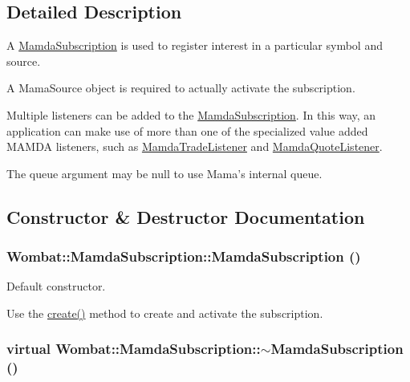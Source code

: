 \subsection{Detailed Description}
A \hyperlink{classWombat_1_1MamdaSubscription}{Mamda\-Subscription} is used to register interest in a particular symbol and source. 

A Mama\-Source object is required to actually activate the subscription.

Multiple listeners can be added to the \hyperlink{classWombat_1_1MamdaSubscription}{Mamda\-Subscription}. In this way, an application can make use of more than one of the specialized value added MAMDA listeners, such as \hyperlink{classWombat_1_1MamdaTradeListener}{Mamda\-Trade\-Listener} and \hyperlink{classWombat_1_1MamdaQuoteListener}{Mamda\-Quote\-Listener}.

The queue argument may be null to use Mama's internal queue. 



\subsection{Constructor \& Destructor Documentation}
\hypertarget{classWombat_1_1MamdaSubscription_ff821c73978e8b6462792aa34daf6fd8}{
\subsubsection[MamdaSubscription]{\setlength{\rightskip}{0pt plus 5cm}Wombat::Mamda\-Subscription::Mamda\-Subscription ()}}
\label{classWombat_1_1MamdaSubscription_ff821c73978e8b6462792aa34daf6fd8}


Default constructor. 

Use the \hyperlink{classWombat_1_1MamdaSubscription_f73189395471119f1cffa620d9ad824e}{create()} method to create and activate the subscription. \hypertarget{classWombat_1_1MamdaSubscription_a49ec43906c65a1a37b8495047ebeb68}{
\subsubsection[$\sim$MamdaSubscription]{\setlength{\rightskip}{0pt plus 5cm}virtual Wombat::Mamda\-Subscription::$\sim$Mamda\-Subscription ()}}
\label{classWombat_1_1MamdaSubscription_a49ec43906c65a1a37b8495047ebeb68}


